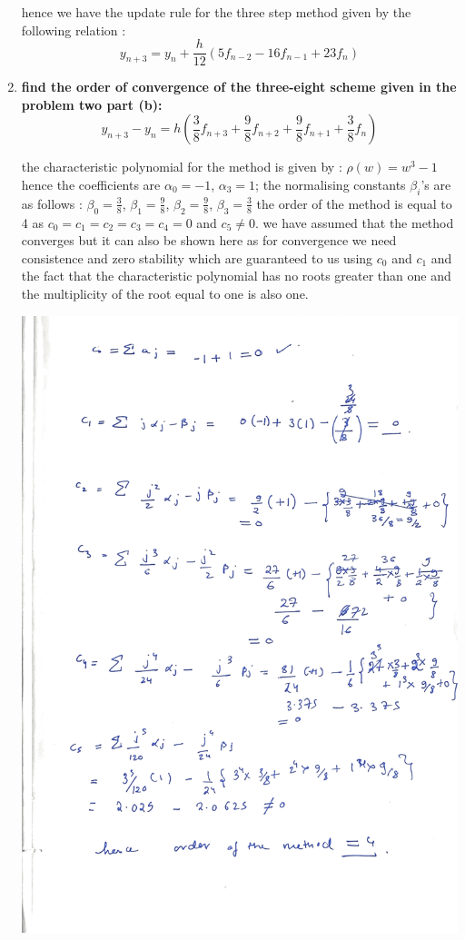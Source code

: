 \documentclass[12pt,letterpaper]{article}
\begin{document}
\begin{enumerate}
   hence we have the update rule for the three step method given by the following relation : 
   \[y_{n+3} = y_n + \frac{h}{12}\left( 5 f_{n-2} - 16 f_{n-1} + 23 f_n\right)\]
  \item
    \textbf{find the order of convergence of the three-eight scheme given in the problem two part (b):}
    \newline
    \newline
    \[y_{n+3} - y_n = h\left(\frac{3}{8} f_{n+3} + \frac{9}{8} f_{n+2} +\frac{9}{8} f_{n+1}+\frac{3}{8} f_{n}\right)\]
    
    the characteristic polynomial for the method is given by : 
    \newline
    \newline 
    $\rho(w) = w^3 - 1$ hence the coefficients are $\alpha_0 = -1$, $\alpha_3 = 1$; the normalising constants $\beta_i$'s are as follows : $\beta_0 = \frac{3}{8}$, $\beta_1 = \frac{9}{8}$, $\beta_2 = \frac{9}{8}$, $\beta_3 = \frac{3}{8}$
    \newline
    \newline
    the order of the method is equal to 4 as $c_0 = c_1 = c_2 = c_3 = c_4 =0$ and $c_5 \not= 0$. we have assumed that the method converges but it can also be shown here as for convergence we need consistence and zero stability which are guaranteed to us using $c_0$ and $c_1$ and the fact that the characteristic polynomial has no roots greater than one and the multiplicity of the root equal to one is also one.
\begin{center}
    \includegraphics[scale=0.2]{file_1.png}

\end{center}
\end{enumerate}
\end{document}
